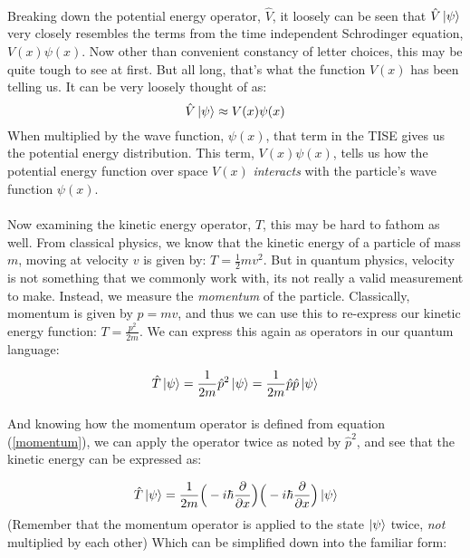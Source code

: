 \documentclass[12pt,letterpaper]{book}
\begin{document}
\paragraph*{}Breaking down the potential energy operator, $\hat{V}$, it loosely can be seen that $\hat{V}\ket{\psi}$ very closely resembles the terms from the time independent Schrodinger equation, $V(x)\psi(x)$. Now other than convenient constancy of letter choices, this may be quite tough to see at first. But all long, that's what the function $V(x)$ has been telling us. It can be very loosely thought of as:
\begin{equation}
\label{potential operator}
\hat{V}\ket{\psi} \approx V(x)\psi(x)
\end{equation}
When multiplied by the wave function, $\psi(x)$, that term in the TISE gives us the potential energy distribution. This term, $V(x)\psi(x)$, tells us how the potential energy function over space $V(x)$ \textit{interacts} with the particle's wave function $\psi(x)$.

\paragraph*{}Now examining the kinetic energy operator, $\hat{T}$, this may be hard to fathom as well. From classical physics, we know that the kinetic energy of a particle of mass $m$, moving at velocity $v$ is given by: $T = \frac{1}{2}mv^2$. But in quantum physics, velocity is not something that we commonly work with, its not really a valid measurement to make. Instead, we measure the \textit{momentum} of the particle. Classically, momentum is given by $p = mv$, and thus we can use this to re-express our kinetic energy function: $T = \frac{p^2}{2m}$. We can express this again as operators in our quantum language:

\begin{equation}
\hat{T}\ket{\psi} = \frac{1}{2m}\hat{p}^2 \ket{\psi} = \frac{1}{2m}\hat{p}\hat{p}\ket{\psi}
\end{equation}
\paragraph*{}And knowing how the momentum operator is defined from equation (\ref{momentum}), we can apply the operator twice as noted by 
$\hat{p}^2$, and see that the kinetic energy can be expressed as:

\begin{equation}
\hat{T}\ket{\psi} = \frac{1}{2m} 
\Big( -i\hbar \frac{\partial}{\partial x}\Big) \Big( -i\hbar \frac{\partial}{\partial x} \Big)\ket{\psi}
\end{equation}
(Remember that the momentum operator is applied to the state $\ket{\psi}$ twice, \textit{not} multiplied by each other) Which can be simplified down into the familiar form:
\end{document}
